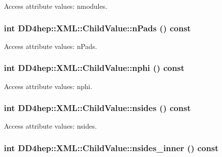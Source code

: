 Access attribute values: nmodules. \hypertarget{struct_d_d4hep_1_1_x_m_l_1_1_child_value_a5c46fd46ff5e4a19b055d348dade942a}{
\subsubsection[{nPads}]{\setlength{\rightskip}{0pt plus 5cm}int DD4hep::XML::ChildValue::nPads () const}}
\label{struct_d_d4hep_1_1_x_m_l_1_1_child_value_a5c46fd46ff5e4a19b055d348dade942a}


Access attribute values: nPads. \hypertarget{struct_d_d4hep_1_1_x_m_l_1_1_child_value_a1b34e68566d9b01889189d2ce22ff2dc}{
\subsubsection[{nphi}]{\setlength{\rightskip}{0pt plus 5cm}int DD4hep::XML::ChildValue::nphi () const}}
\label{struct_d_d4hep_1_1_x_m_l_1_1_child_value_a1b34e68566d9b01889189d2ce22ff2dc}


Access attribute values: nphi. \hypertarget{struct_d_d4hep_1_1_x_m_l_1_1_child_value_adc8cf2dc81eb12335fedc345b2120bb2}{
\subsubsection[{nsides}]{\setlength{\rightskip}{0pt plus 5cm}int DD4hep::XML::ChildValue::nsides () const}}
\label{struct_d_d4hep_1_1_x_m_l_1_1_child_value_adc8cf2dc81eb12335fedc345b2120bb2}


Access attribute values: nsides. \hypertarget{struct_d_d4hep_1_1_x_m_l_1_1_child_value_ac0134a149a070111ad3961fe8362e438}{
\subsubsection[{nsides\_\-inner}]{\setlength{\rightskip}{0pt plus 5cm}int DD4hep::XML::ChildValue::nsides\_\-inner () const}}
\label{struct_d_d4hep_1_1_x_m_l_1_1_child_value_ac0134a149a070111ad3961fe8362e438}



